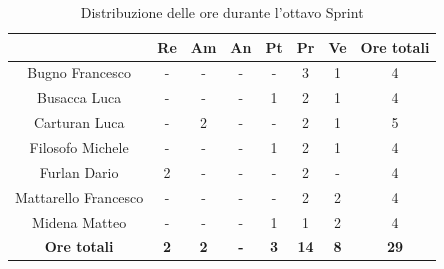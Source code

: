 \begin{table}[H]
  \centering
  \renewcommand{\arraystretch}{1.8}
  \begin{tabular}{c|c|c|c|c|c|c|c}
    \rowcolor[HTML]{125E28}
    \multicolumn{1}{c}{\color[HTML]{FFFFFF}\textbf{ Nominativo }}
                         & \multicolumn{1}{c}{\color[HTML]{FFFFFF}\textbf{ Re }}
                         & \multicolumn{1}{c}{\color[HTML]{FFFFFF}\textbf{ Am}}
                         & \multicolumn{1}{c}{\color[HTML]{FFFFFF}\textbf{ An }}
                         & \multicolumn{1}{c}{\color[HTML]{FFFFFF}\textbf{ Pt }}
                         & \multicolumn{1}{c}{\color[HTML]{FFFFFF}\textbf{ Pr }}
                         & \multicolumn{1}{c}{\color[HTML]{FFFFFF}\textbf{ Ve }}
                         & \multicolumn{1}{c}{\color[HTML]{FFFFFF}\textbf{ Ore totali }}                                                                                 \\
    \hline
    Bugno Francesco      & -                                                             & -          & -          & -          & 3           & 1          & 4           \\
    Busacca Luca         & -                                                             & -          & -          & 1          & 2           & 1          & 4           \\
    Carturan Luca        & -                                                             & 2          & -          & -          & 2           & 1          & 5           \\
    Filosofo Michele     & -                                                             & -          & -          & 1          & 2           & 1          & 4           \\
    Furlan Dario         & 2                                                             & -          & -          & -          & 2           & -          & 4           \\
    Mattarello Francesco & -                                                             & -          & -          & -          & 2           & 2          & 4           \\
    Midena Matteo        & -                                                             & -          & -          & 1          & 1           & 2          & 4           \\
    \textbf{Ore totali}  & \textbf{2}                                                    & \textbf{2} & \textbf{-} & \textbf{3} & \textbf{14} & \textbf{8} & \textbf{29}
  \end{tabular}
  \caption{Distribuzione delle ore durante l'ottavo Sprint}
\end{table}

